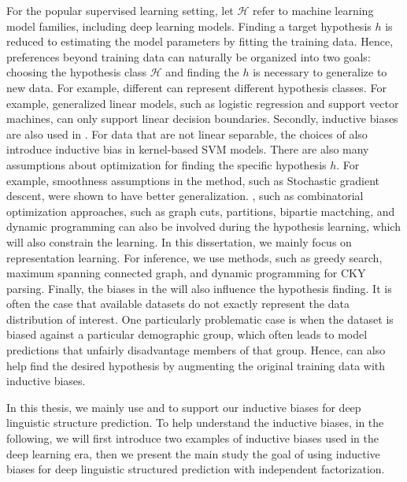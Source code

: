 For the popular supervised learning setting, let $\mathcal{H}$ refer
to machine learning model families, including deep learning
models. Finding a target hypothesis $h$ is reduced to estimating the
model parameters by fitting the training data. Hence, preferences
beyond training data can naturally be organized into two goals:
choosing the hypothesis class $\mathcal{H}$ and finding the $h$ is
necessary to generalize to new data. For example, different  can represent different hypothesis classes. For example,
generalized linear models, such as logistic regression and support
vector machines, can only support linear decision
boundaries. Secondly, inductive biases are also used in . For data that are not linear separable, the choices of
 also introduce inductive bias in kernel-based
SVM models. There are also many assumptions about optimization for
finding the specific hypothesis $h$. For example, smoothness
assumptions in the  method, such as Stochastic
gradient descent, were shown to have better
generalization. , such as combinatorial
optimization approaches, such as graph cuts, partitions, bipartie
mactching, and dynamic programming can also be involved during the
hypothesis learning, which will also constrain the learning. In this
dissertation, we mainly focus on representation learning. For
inference, we use methods, such as greedy search, maximum spanning
connected graph, and dynamic programming for CKY parsing. Finally, the
biases in the  will also influence the hypothesis
finding. It is often the case that available datasets do not exactly
represent the data distribution of interest. One particularly
problematic case is when the dataset is biased against a particular
demographic group, which often leads to model predictions that
unfairly disadvantage members of that group. Hence,  can also help find the desired hypothesis by
augmenting the original training data with inductive biases.

In this thesis, we mainly use  and  to support our inductive biases for deep linguistic
structure prediction. To help understand the inductive biases, in
the following, we will first introduce two examples of inductive
biases used in the deep learning era, then we present the main study
the goal of using inductive biases for deep linguistic structured
prediction with independent factorization.


